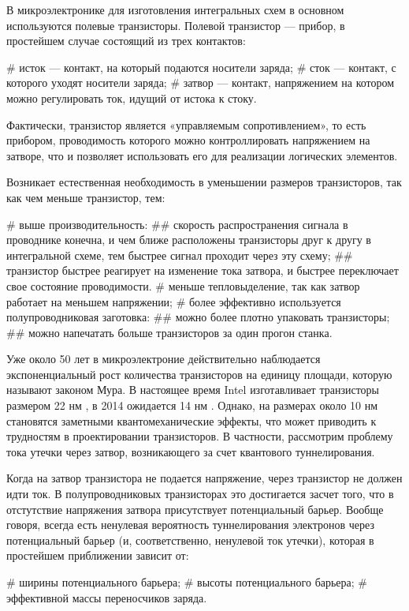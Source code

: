 \startprefacepage

В микроэлектронике для изготовления интегральных схем в основном используются полевые транзисторы. Полевой транзистор — прибор, в простейшем случае состоящий из трех контактов:
\begin{easylist}[itemize]
# исток — контакт, на который подаются носители заряда;
# сток — контакт, с которого уходят носители заряда;
# затвор — контакт, напряжением на котором можно регулировать ток, идущий от истока к стоку.
\end{easylist}
Фактически, транзистор является «управляемым сопротивлением», то есть прибором, проводимость которого можно контроллировать напряжением на затворе, что и позволяет использовать его для реализации логических элементов.

Возникает естественная необходимость в уменьшении размеров транзисторов, так как чем меньше транзистор, тем:
\begin{easylist}[itemize]
# выше производительность:
## скорость распространения сигнала в проводнике конечна, и чем ближе расположены транзисторы друг к другу в интегральной схеме, тем быстрее сигнал проходит через эту схему;
## транзистор быстрее реагирует на изменение тока затвора, и быстрее переключает свое состояние проводимости.
# меньше тепловыделение, так как затвор работает на меньшем напряжении;
# более эффективно используется полупроводниковая заготовка:
## можно более плотно упаковать транзисторы;
## можно напечатать больше транзисторов за один прогон станка.
\end{easylist}

Уже около 50 лет в микроэлектроние действительно наблюдается экспоненциальный рост количества транзисторов на единицу площади, которую называют законом Мура. В настоящее время Intel изготавливает транзисторы размером 22 нм \cite{intel_22_nm}, в 2014 ожидается 14 нм \cite{14_nm}. Однако, на размерах около 10 нм становятся заметными квантомеханические эффекты, что может приводить к трудностям в проектировании транзисторов. В частности, рассмотрим проблему тока утечки через затвор, возникающего за счет квантового туннелирования.

Когда на затвор транзистора не подается напряжение, через транзистор не должен идти ток. В полупроводниковых транзисторах это достигается засчет того, что в отстутствие напряжения затвора присутствует потенциальный барьер. Вообще говоря, всегда есть ненулевая вероятность туннелирования электронов через потенциальный барьер (и, соответственно, ненулевой ток утечки), которая в простейшем приближении зависит от:
\begin{easylist}[itemize]
# ширины потенциального барьера;
# высоты потенциального барьера;
# эффективной массы переносчиков заряда.
\end{easylist}

